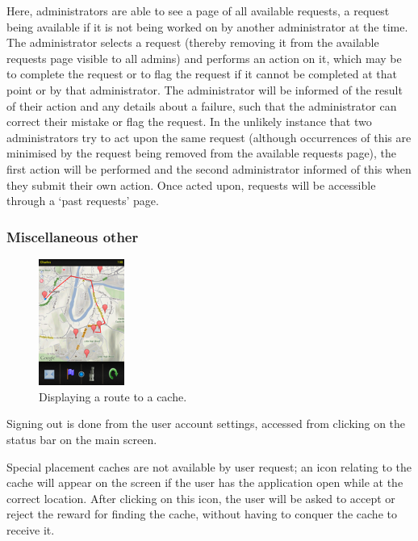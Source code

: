 Here, administrators are able to see a page of all available requests, a request being available if it is not being worked on by another administrator at the time. The administrator selects a request (thereby removing it from the available requests page visible to all admins) and performs an action on it, which may be to complete the request or to flag the request if it cannot be completed at that point or by that administrator. The administrator will be informed of the result of their action and any details about a failure, such that the administrator can correct their mistake or flag the request. In the unlikely instance that two administrators try to act upon the same request (although occurrences of this are minimised by the request being removed from the available requests page), the first action will be performed and the second administrator informed of this when they submit their own action. Once acted upon, requests will be accessible through a ‘past requests’ page.

\subsubsection{Miscellaneous other}

\begin{figure}
	\vspace{-40pt}
	\begin{center}
	\includegraphics[width=0.25\textwidth]{images/route_mapping}
	\caption{Displaying a route to a cache.}
	\label{route_mapping}
	\end{center}
	\vspace{-80pt}
\end{figure}

Signing out is done from the user account settings, accessed from clicking on the status bar on the main screen.

Special placement caches are not available by user request; an icon relating to the cache will appear on the screen if the user has the application open while at the correct location. After clicking on this icon, the user will be asked to accept or reject the reward for finding the cache, without having to conquer the cache to receive it.


